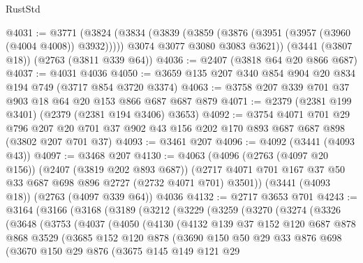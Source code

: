 \begin{lexlean}{RustStd}
\begin{coremodule}
@4031 := @3771
    (@3824
      (@3834
        (@3839 (@3859 (@3876 (@3951 (@3957 (@3960 (@4004 @4008)) @3932)))))
        @3074
        @3077
        @3080
        @3083
        @3621))
    (@3441 (@3807 @18))
    (@2763 (@3811 @339 @64))
@4036 := @2407 (@3818 @64 @20 @866 @687)
@4037 := @4031 @4036
@4050 := @3659 @135 @207 @340 @854 @904 @20 @834 @194 @749 (@3717 @854 @3720 @3374)
@4063 := @3758 @207 @339 @701 @37 @903 @18 @64 @20 @153 @866 @687 @687 @879
@4071 := @2379 (@2381 @199 @3401) (@2379 (@2381 @194 @3406) @3653)
@4092 := @3754
    @4071
    @701
    @29
    @796
    @207
    @20
    @701
    @37
    @902
    @43
    @156
    @202
    @170
    @893
    @687
    @687
    @898
    (@3802 @207 @701 @37)
@4093 := @3461 @207
@4096 := @4092 (@3441 (@4093 @43))
@4097 := @3468 @207
@4130 := @4063
    (@4096
      (@2763 (@4097 @20 @156))
      (@2407 (@3819 @202 @893 @687))
      (@2717 @4071 @701 @167 @37 @50 @33 @687 @698 @896 @2727 (@2732 @4071 @701) @3501))
    (@3441 (@4093 @18))
    (@2763 (@4097 @339 @64))
    @4036
@4132 := @2717 @3653 @701
@4243 := @3164
    (@3166
      (@3168
        (@3189
          (@3212
            (@3229
              (@3259
                (@3270
                  (@3274
                    (@3326
                      (@3648
                        (@3753
                          (@4037
                            (@4050
                              (@4130
                                (@4132
                                  @139
                                  @37
                                  @152
                                  @120
                                  @687
                                  @878
                                  @868
                                  @3529
                                  (@3685
                                    @152
                                    @120
                                    @878
                                    (@3690
                                      @150
                                      @50
                                      @29
                                      @33
                                      @876
                                      @698
                                      (@3670
                                        @150
                                        @29
                                        @876
                                        (@3675
                                          @145
                                          @149
                                          @121
                                          @29

\end{coremodule}
\end{lexlean}
